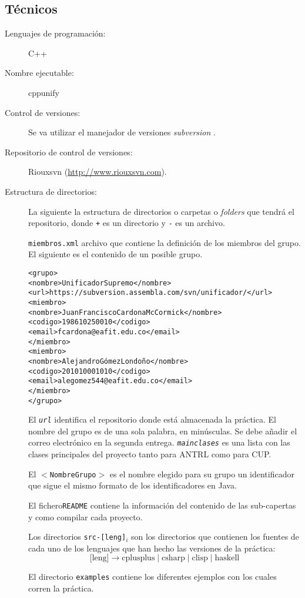 \documentclass{article}
\begin{document}
\subsection{Técnicos}
\label{sec:reqtec}

\begin{description}
\item[Lenguajes de programación:] C++
\item[Nombre ejecutable:] cppunify
\item[Control de versiones:] Se va utilizar el manejador de versiones \emph{subversion} \cite{pilato}.
\item[Repositorio de control de versiones:] Riouxsvn (\url{http://www.riouxsvn.com}).
\item[Estructura de directorios:] La siguiente la estructura de
  directorios o carpetas o \emph{folders} que tendrá el repositorio, donde
  \texttt{+} es un directorio y \texttt{-} es un archivo.
\begin{alltt}
\end{alltt}

  \texttt{miembros.xml} archivo que contiene la definición de los
  miembros del grupo. El siguiente es el contenido de un posible grupo.

  {\footnotesize
\begin{alltt}
<grupo>
   <nombre>UnificadorSupremo</nombre>
   <url>https://subversion.assembla.com/svn/unificador/</url>
   <miembro>
      <nombre>Juan Francisco Cardona McCormick</nombre>
      <codigo>198610250010</codigo>
      <email>fcardona@eafit.edu.co</email>
   </miembro>
   <miembro>
      <nombre>Alejandro Gómez Londoño</nombre>
      <codigo>201010001010</codigo>
      <email>alegomez544@eafit.edu.co</email>
   </miembro>
</grupo>
\end{alltt}
  }

  El \emph{\texttt{url}} identifica el repositorio donde está
  almacenada la práctica.  El nombre del grupo es de una sola palabra,
  en minúsculas. Se debe añadir el correo electrónico en la segunda
  entrega. \emph{\texttt{mainclases}} es una lista con las clases
  principales del proyecto tanto para ANTRL como para CUP.

  El \texttt{$<$NombreGrupo$>$} es el nombre elegido para su grupo un identificador que
  sigue el mismo formato de los identificadores en Java.

  El fichero\texttt{README} contiene la información del contenido de las
  sub-capertas y como compilar cada proyecto.

  Los directorios \texttt{src-[leng]$_i$} son los directorios que
  contienen los fuentes de cada uno de los lenguajes que han hecho las
  versiones de la práctica:
  \[
    \text{[leng]} \to \text{cplusplus} \mid \text{csharp} \mid \text{clisp} \mid \text{haskell}
  \]

  El directorio \texttt{examples} contiene los diferentes ejemplos con
  los cuales corren la práctica.

\end{description}
\end{document}
